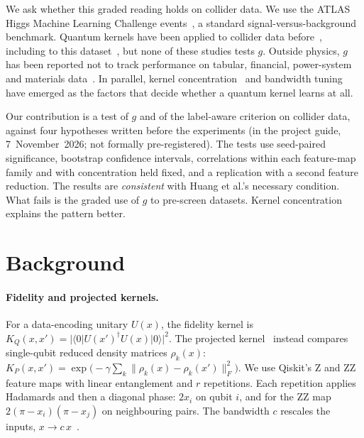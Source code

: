 \documentclass[10pt,a4paper]{article}
\begin{document}
We ask whether this graded reading holds on collider data. We use the ATLAS Higgs Machine Learning Challenge
events~\cite{atlas2014higgsdata,adambourdarios2015higgsml}, a standard signal-versus-background benchmark. Quantum
kernels have been applied to collider data before~\cite{wu2021qsvm,belis2021higgs,heredge2021bmeson,fadol2024cepc,
duckett2024tracks,belis2024anomaly,odagiu2025reduced}, including to this dataset~\cite{bhardwaj2026higgs}, but none
of these studies tests $g$. Outside physics, $g$ has been reported not to track performance on tabular, financial,
power-system and materials data~\cite{egginger2024hyperparameter,shen2026stock,islam2026power,adams2026materials}.
In parallel, kernel concentration~\cite{thanasilp2024concentration} and bandwidth tuning~\cite{shaydulin2022bandwidth,
canatar2023bandwidth,slattery2023numerical,florezablan2025similarity} have emerged as the factors that decide whether a
quantum kernel learns at all.

Our contribution is a test of $g$ and of the label-aware criterion on collider data, against four hypotheses
written before the experiments (in the project guide, 7~November~2026; not formally pre-registered). The tests use
seed-paired significance, bootstrap confidence intervals, correlations within each feature-map family and with
concentration held fixed, and a replication with a second feature reduction. The results are \emph{consistent} with
Huang et al.'s necessary condition. What fails is the graded use of $g$ to pre-screen datasets. Kernel concentration
explains the pattern better.

\section{Background}
\paragraph{Fidelity and projected kernels.}
For a data-encoding unitary $U(x)$, the fidelity kernel is $K_Q(x,x')=|\langle 0|U(x')^\dagger U(x)|0\rangle|^2$.
The projected kernel~\cite{huang2021power} instead compares single-qubit reduced density matrices $\rho_k(x)$:
$K_P(x,x')=\exp\!\big(-\gamma\sum_k\|\rho_k(x)-\rho_k(x')\|_F^2\big)$. We use Qiskit's Z and ZZ feature maps with linear
entanglement and $r$ repetitions. Each repetition applies Hadamards and then a diagonal phase: $2x_i$ on qubit $i$,
and for the ZZ map $2(\pi-x_i)(\pi-x_j)$ on neighbouring pairs. The bandwidth $c$ rescales the inputs,
$x\to c\,x$~\cite{shaydulin2022bandwidth}.
\end{document}
